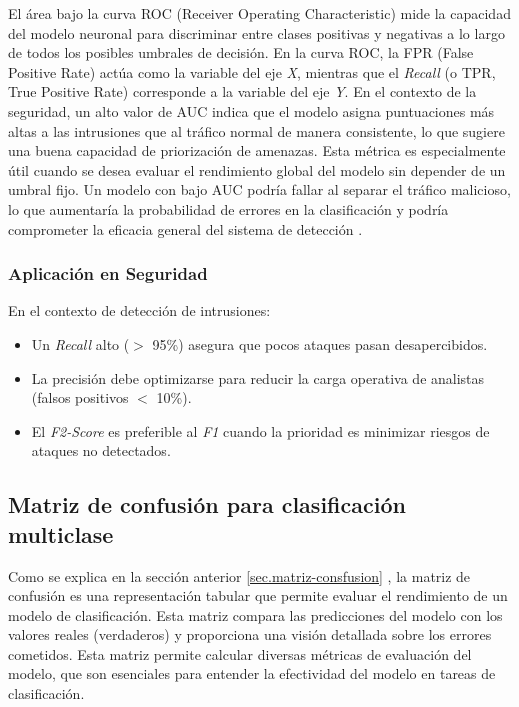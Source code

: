 \begin{itemize}
El área bajo la curva ROC (Receiver Operating Characteristic) mide la capacidad del modelo neuronal para discriminar entre clases positivas y negativas a lo largo de todos los posibles umbrales de decisión. 
En la curva ROC, la FPR (False Positive Rate) actúa como la variable del eje \textit{X}, mientras que el \textit{Recall} (o TPR, True Positive Rate) corresponde a la variable del eje \textit{Y}. En el contexto de la seguridad, un alto valor de AUC indica que el modelo asigna puntuaciones más altas a las intrusiones que al tráfico normal de manera consistente, lo que sugiere una buena capacidad de priorización de amenazas. Esta métrica es especialmente útil cuando se desea evaluar el rendimiento global del modelo sin depender de un umbral fijo. Un modelo con bajo AUC podría fallar al separar el tráfico malicioso, lo que aumentaría la probabilidad de errores en la clasificación y podría comprometer la eficacia general del sistema de detección \cite{fawcett2006introduction}.

\end{itemize}

\subsubsection{Aplicación en Seguridad}	\label{sec:apli-met-seg}
En el contexto de detección de intrusiones:
\begin{itemize}
    \item Un \textit{Recall} alto ($>$ 95\%) asegura que pocos ataques pasan desapercibidos.
    \item La precisión debe optimizarse para reducir la carga operativa de analistas (falsos positivos $<$ 10\%).
    \item El \textit{F2-Score} es preferible al \textit{F1} cuando la prioridad es minimizar riesgos de ataques no detectados.
\end{itemize}




\subsection{Matriz de confusión para clasificación multiclase} \label{sec.matriz-consfusion-multi}

Como se explica en la sección anterior \ref{sec.matriz-consfusion} , la matriz de confusión es una representación tabular que permite evaluar el rendimiento de un modelo de clasificación. Esta matriz compara las predicciones del modelo con los valores reales (verdaderos) y proporciona una visión detallada sobre los errores cometidos. Esta matriz permite calcular diversas métricas de evaluación del modelo, que son esenciales para entender la efectividad del modelo en tareas de clasificación.


